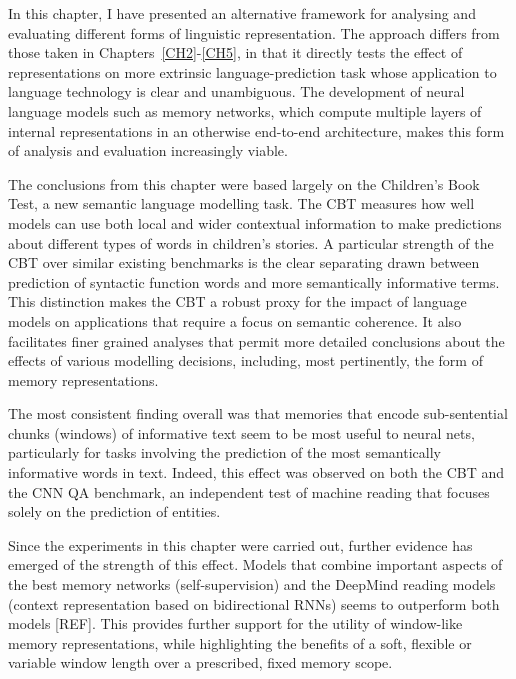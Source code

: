 In this chapter, I have presented an alternative framework for analysing and evaluating different forms of linguistic representation. The approach differs from those taken in Chapters~\ref{CH2}-\ref{CH5}, in that it directly tests the effect of representations on more extrinsic language-prediction task whose application to language technology is clear and unambiguous. The development of neural language models such as memory networks, which compute multiple layers of internal representations in an otherwise end-to-end architecture, makes this form of analysis and evaluation increasingly viable.  

The conclusions from this chapter were based largely on the Children's Book Test, a new semantic language modelling task. The CBT measures how well models can use both local and wider contextual information to make predictions about different types of words in children's stories. A particular strength of the CBT over similar existing benchmarks is the clear separating drawn between prediction of syntactic function words and more semantically informative terms. This distinction makes the CBT a robust proxy for the impact of language models on applications that require a focus on semantic coherence. It also facilitates finer grained analyses that permit more detailed conclusions about the effects of various modelling decisions, including, most pertinently, the form of memory representations. 

The most consistent finding overall was that memories that encode sub-sentential chunks (windows) of informative text seem to be most useful to neural nets, particularly for tasks involving the prediction of the most semantically informative words in text. Indeed, this effect was observed on both the CBT and the CNN QA benchmark, an independent test of machine reading that focuses solely on the prediction of entities. 

Since the experiments in this chapter were carried out, further evidence has emerged of the strength of this effect. Models that combine important aspects of the best memory networks (self-supervision) and the DeepMind reading models (context representation based on bidirectional RNNs) seems to outperform both models [REF]. This provides further support for the utility of window-like memory representations, while highlighting the benefits of a soft, flexible or variable window length over a prescribed, fixed memory scope.  


